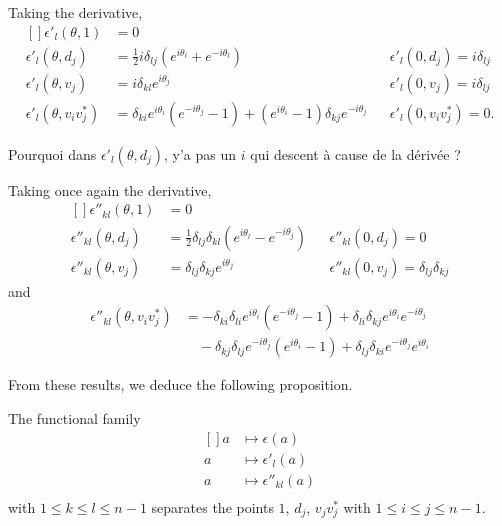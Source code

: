 Taking the derivative,
\begin{equation}
    \begin{aligned}[]
        \epsilon'_l(\theta,1)&=0\\
        \epsilon'_l(\theta,d_j)&=\frac{ 1 }{2}i\delta_{lj}( e^{i\theta_l}+ e^{-i\theta_l})                             &&\epsilon'_l(0,d_j)=i\delta_{lj}\\
        \epsilon'_l(\theta,v_j)&=i\delta_{kl} e^{i\theta_j}                                                           &&\epsilon'_l(0,v_j)=i\delta_{lj}\\
        \epsilon'_l(\theta,v_iv_j^*)&=\delta_{ki} e^{i\theta_i}( e^{-i\theta_j}-1)+( e^{i\theta_i}-1)\delta_{kj} e^{-i\theta_j}     &&\epsilon'_l(0,v_iv_j^*)=0.
    \end{aligned}
\end{equation}

\begin{probleme}
    Pourquoi dans $\epsilon'_l(\theta,d_j)$, y'a pas un $i$ qui descent à cause de la dérivée ?
\end{probleme}

Taking once again the derivative,
\begin{equation}
    \begin{aligned}[]
        \epsilon''_{kl}(\theta,1)&=0\\
        \epsilon''_{kl}(\theta,d_j)&=\frac{ 1 }{2}\delta_{lj}\delta_{kl}( e^{i\theta_l}- e^{-i\theta_j})&&\epsilon''_{kl}(0,d_j)=0\\
        \epsilon''_{kl}(\theta,v_j)&=\delta_{lj}\delta_{kj} e^{i\theta_j}&&\epsilon''_{kl}(0,v_j)=\delta_{lj}\delta_{kj}
    \end{aligned}
\end{equation}
and
\begin{subequations}
    \begin{align}
        \epsilon''_{kl}(\theta,v_iv_j^*)&
        =-\delta_{ki}\delta_{li} e^{i\theta_i}( e^{-i\theta_j}-1)
        +\delta_{li}\delta_{kj} e^{i\theta_i} e^{-i\theta_j}\\
        &\quad-\delta_{kj}\delta_{lj} e^{-i\theta_j} ( e^{i\theta_i}-1)
        +\delta_{lj}\delta_{ki} e^{-i\theta_j} e^{i\theta_i}        \label{SubEqepsppsurvvs}
    \end{align}
\end{subequations}


From these results, we deduce the following proposition.
\begin{proposition}
    The functional family
    \begin{equation}
        \begin{aligned}[]
            a&\mapsto\epsilon(a)\\
            a&\mapsto\epsilon'_l(a)\\
            a&\mapsto\epsilon''_{kl}(a)\\
        \end{aligned}
    \end{equation}
    with $1\leq k\leq l\leq n-1$ separates the points $1$, $d_j$, $v_jv_j^*$ with $1\leq i\leq j\leq n-1$.
\end{proposition}


